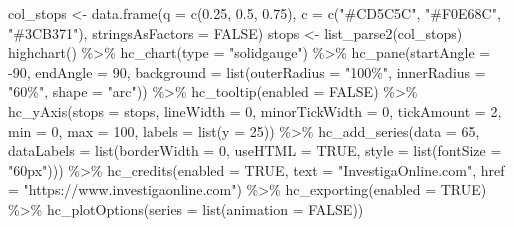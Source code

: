 \documentclass[
]{book}
\newenvironment{Shaded}{\begin{snugshade}}{\end{snugshade}}
\newcommand{\AttributeTok}[1]{\textcolor[rgb]{0.77,0.63,0.00}{#1}}
\newcommand{\ConstantTok}[1]{\textcolor[rgb]{0.00,0.00,0.00}{#1}}
\newcommand{\DecValTok}[1]{\textcolor[rgb]{0.00,0.00,0.81}{#1}}
\newcommand{\FloatTok}[1]{\textcolor[rgb]{0.00,0.00,0.81}{#1}}
\newcommand{\FunctionTok}[1]{\textcolor[rgb]{0.00,0.00,0.00}{#1}}
\newcommand{\NormalTok}[1]{#1}
\newcommand{\OtherTok}[1]{\textcolor[rgb]{0.56,0.35,0.01}{#1}}
\newcommand{\SpecialCharTok}[1]{\textcolor[rgb]{0.00,0.00,0.00}{#1}}
\newcommand{\StringTok}[1]{\textcolor[rgb]{0.31,0.60,0.02}{#1}}
\begin{document}
\begin{Shaded}
\begin{Highlighting}[]
\NormalTok{col\_stops }\OtherTok{\textless{}{-}} \FunctionTok{data.frame}\NormalTok{(}\AttributeTok{q =} \FunctionTok{c}\NormalTok{(}\FloatTok{0.25}\NormalTok{, }\FloatTok{0.5}\NormalTok{, }\FloatTok{0.75}\NormalTok{), }\AttributeTok{c =} \FunctionTok{c}\NormalTok{(}\StringTok{"\#CD5C5C"}\NormalTok{,}
  \StringTok{"\#F0E68C"}\NormalTok{, }\StringTok{"\#3CB371"}\NormalTok{), }\AttributeTok{stringsAsFactors =} \ConstantTok{FALSE}\NormalTok{)}
\NormalTok{stops }\OtherTok{\textless{}{-}} \FunctionTok{list\_parse2}\NormalTok{(col\_stops)}
\FunctionTok{highchart}\NormalTok{() }\SpecialCharTok{\%\textgreater{}\%}
  \FunctionTok{hc\_chart}\NormalTok{(}\AttributeTok{type =} \StringTok{"solidgauge"}\NormalTok{) }\SpecialCharTok{\%\textgreater{}\%}
  \FunctionTok{hc\_pane}\NormalTok{(}\AttributeTok{startAngle =} \SpecialCharTok{{-}}\DecValTok{90}\NormalTok{, }\AttributeTok{endAngle =} \DecValTok{90}\NormalTok{, }\AttributeTok{background =} \FunctionTok{list}\NormalTok{(}\AttributeTok{outerRadius =} \StringTok{"100\%"}\NormalTok{,}
    \AttributeTok{innerRadius =} \StringTok{"60\%"}\NormalTok{, }\AttributeTok{shape =} \StringTok{"arc"}\NormalTok{)) }\SpecialCharTok{\%\textgreater{}\%}
  \FunctionTok{hc\_tooltip}\NormalTok{(}\AttributeTok{enabled =} \ConstantTok{FALSE}\NormalTok{) }\SpecialCharTok{\%\textgreater{}\%}
  \FunctionTok{hc\_yAxis}\NormalTok{(}\AttributeTok{stops =}\NormalTok{ stops, }\AttributeTok{lineWidth =} \DecValTok{0}\NormalTok{, }\AttributeTok{minorTickWidth =} \DecValTok{0}\NormalTok{,}
    \AttributeTok{tickAmount =} \DecValTok{2}\NormalTok{, }\AttributeTok{min =} \DecValTok{0}\NormalTok{, }\AttributeTok{max =} \DecValTok{100}\NormalTok{, }\AttributeTok{labels =} \FunctionTok{list}\NormalTok{(}\AttributeTok{y =} \DecValTok{25}\NormalTok{)) }\SpecialCharTok{\%\textgreater{}\%}
  \FunctionTok{hc\_add\_series}\NormalTok{(}\AttributeTok{data =} \DecValTok{65}\NormalTok{, }\AttributeTok{dataLabels =} \FunctionTok{list}\NormalTok{(}\AttributeTok{borderWidth =} \DecValTok{0}\NormalTok{,}
    \AttributeTok{useHTML =} \ConstantTok{TRUE}\NormalTok{, }\AttributeTok{style =} \FunctionTok{list}\NormalTok{(}\AttributeTok{fontSize =} \StringTok{"60px"}\NormalTok{))) }\SpecialCharTok{\%\textgreater{}\%}
  \FunctionTok{hc\_credits}\NormalTok{(}\AttributeTok{enabled =} \ConstantTok{TRUE}\NormalTok{, }\AttributeTok{text =} \StringTok{"InvestigaOnline.com"}\NormalTok{,}
    \AttributeTok{href =} \StringTok{"https://www.investigaonline.com"}\NormalTok{) }\SpecialCharTok{\%\textgreater{}\%}
  \FunctionTok{hc\_exporting}\NormalTok{(}\AttributeTok{enabled =} \ConstantTok{TRUE}\NormalTok{) }\SpecialCharTok{\%\textgreater{}\%}
  \FunctionTok{hc\_plotOptions}\NormalTok{(}\AttributeTok{series =} \FunctionTok{list}\NormalTok{(}\AttributeTok{animation =} \ConstantTok{FALSE}\NormalTok{))}
\end{Highlighting}
\end{Shaded}
\end{document}
